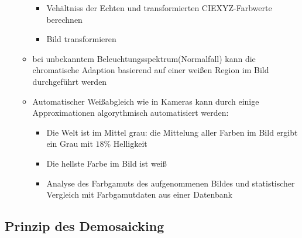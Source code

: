 \documentclass[11pt]{article}
\begin{document}
\begin{itemize}
\begin{itemize}
\begin{itemize}
                \item Vehältniss der Echten und transformierten CIEXYZ-Farbwerte berechnen
                \item Bild transformieren
            \end{itemize}
            \item bei unbekanntem Beleuchtungsspektrum(Normalfall) kann die chromatische Adaption basierend auf einer weißen Region im Bild durchgeführt werden
            \item Automatischer Weißabgleich wie in Kameras kann durch einige Approximationen algorythmisch automatisiert werden:
            \begin{itemize}
                \item Die Welt ist im Mittel grau: die Mittelung aller Farben im Bild ergibt ein Grau mit $18\%$ Helligkeit
                \item Die hellste Farbe im Bild ist weiß
                \item Analyse des Farbgamuts des aufgenommenen Bildes und statistischer Vergleich mit Farbgamutdaten aus einer Datenbank
            \end{itemize}
        \end{itemize}
\end{itemize}

\subsection{Prinzip des Demosaicking}
\end{document}
